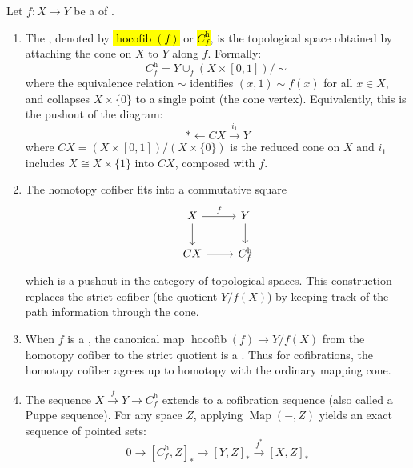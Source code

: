 \begin{definition} \label{definition:homotopy_cofiber_of_a_map_of_topological_spaces}

Let $f: X \to Y$ be a  of .

\begin{enumerate}
    \item The , denoted by \hl{$\operatorname{hocofib}(f)$} or \hl{$C_f^{\mathrm{h}}$}, is the topological space obtained by attaching the cone on $X$ to $Y$ along $f$. Formally:
    $$ C_f^{\mathrm{h}} = Y \cup_f (X \times [0,1]) / \sim $$
    where the equivalence relation $\sim$ identifies $(x, 1) \sim f(x)$ for all $x \in X$, and collapses $X \times \{0\}$ to a single point (the cone vertex). Equivalently, this is the pushout of the diagram:
    $$ * \leftarrow CX \xrightarrow{i_1} Y $$
    where $CX = (X \times [0,1]) / (X \times \{0\})$ is the reduced cone on $X$ and $i_1$ includes $X \cong X \times \{1\}$ into $CX$, composed with $f$.

    \item The homotopy cofiber fits into a commutative square
    $$
    \begin{tikzcd}
    X \arrow[r, "f"] \arrow[d] & Y \arrow[d] \\
    CX \arrow[r] & C_f^{\mathrm{h}}
    \end{tikzcd}
    $$
    which is a pushout in the category of topological spaces. This construction replaces the strict cofiber (the quotient $Y / f(X)$) by keeping track of the path information through the cone.

    \item When $f$ is a , the canonical map $\operatorname{hocofib}(f) \to Y/f(X)$ from the homotopy cofiber to the strict quotient is a . Thus for cofibrations, the homotopy cofiber agrees up to homotopy with the ordinary mapping cone.

    \item The sequence $X \xrightarrow{f} Y \to C_f^{\mathrm{h}}$ extends to a cofibration sequence (also called a Puppe sequence). For any space $Z$, applying $\operatorname{Map}(-, Z)$ yields an exact sequence of pointed sets:
    $$ 0 \to [C_f^{\mathrm{h}}, Z]_* \to [Y, Z]_* \xrightarrow{f^*} [X, Z]_* $$


\end{enumerate}
\end{definition}
